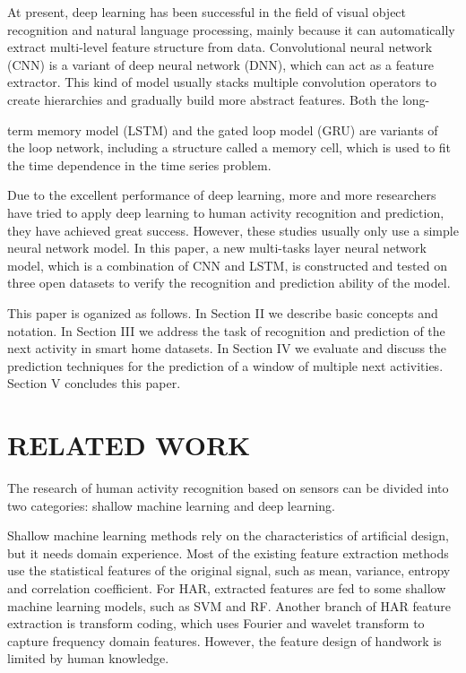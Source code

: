 \documentclass{article}
\begin{document}
At present, deep learning has been successful in the field of visual object recognition and natural language processing, mainly because it can automatically extract multi-level feature structure from data. Convolutional neural network (CNN) is a variant of deep neural network (DNN), which can act as a feature extractor. This kind of model usually stacks multiple convolution operators to create hierarchies and gradually build more abstract features. Both the long-



term memory model (LSTM) and the gated loop model (GRU) are variants of the loop network, including a structure called a memory cell, which is used to fit the time dependence in the time series problem.

Due to the excellent performance of deep learning, more and more researchers have tried to apply deep learning to human activity recognition and prediction, they have achieved great success. However, these studies usually only use a simple neural network model. In this paper, a new multi-tasks layer neural network model, which is a combination of CNN and LSTM, is constructed and tested on three open datasets to verify the recognition and prediction ability of the model.

This paper is oganized as follows. In Section II we describe basic concepts and notation. In Section III we address the task of recognition and prediction of the next activity in smart home datasets. In Section IV we evaluate and discuss the prediction techniques for the prediction of a window of multiple next activities. Section V concludes this paper.


\section{RELATED WORK}
The research of human activity recognition based on sensors can be divided into two categories: shallow machine learning and deep learning.

Shallow machine learning methods rely on the characteristics of artificial design, but it needs domain experience. Most of the existing feature extraction methods use the statistical features of the original signal, such as mean, variance, entropy and correlation coefficient. For HAR, extracted features are fed to some shallow machine learning models, such as SVM and RF. Another branch of HAR feature extraction is transform coding, which uses Fourier and wavelet transform to capture frequency domain features. However, the feature design of handwork is limited by human knowledge.
\end{document}
